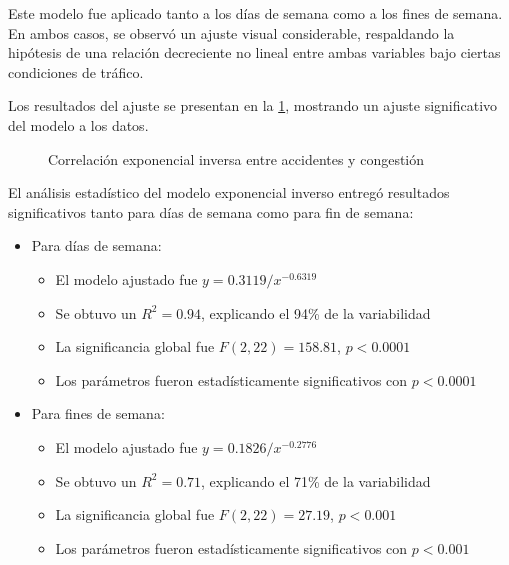 \documentclass[12pt]{article}
\begin{document}
Este modelo fue aplicado tanto a los días de semana como a los fines de semana. En ambos casos, se observó un ajuste visual considerable, respaldando la hipótesis de una relación decreciente no lineal entre ambas variables bajo ciertas condiciones de tráfico.

Los resultados del ajuste se presentan en la \cref{fig:corr_exp}, mostrando un ajuste significativo del modelo a los datos.

\begin{figure}[H]
    \centering
    \newline
    \newline
    \caption{Correlación exponencial inversa entre accidentes y congestión}
    \label{fig:corr_exp}
\end{figure}

El análisis estadístico del modelo exponencial inverso entregó resultados significativos tanto para días de semana como para fin de semana:

\begin{itemize}
    \item Para días de semana:
    \begin{itemize}
        \item El modelo ajustado fue $y = 0.3119/x^{-0.6319}$
        \item Se obtuvo un $R^2 = 0.94$, explicando el 94\% de la variabilidad
        \item La significancia global fue $F(2, 22) = 158.81$, $p < 0.0001$
        \item Los parámetros fueron estadísticamente significativos con $p < 0.0001$
    \end{itemize}

    \item Para fines de semana:
    \begin{itemize}
        \item El modelo ajustado fue $y = 0.1826/x^{-0.2776}$
        \item Se obtuvo un $R^2 = 0.71$, explicando el 71\% de la variabilidad
        \item La significancia global fue $F(2, 22) = 27.19$, $p < 0.001$
        \item Los parámetros fueron estadísticamente significativos con $p < 0.001$
    \end{itemize}
\end{itemize}
\end{document}
